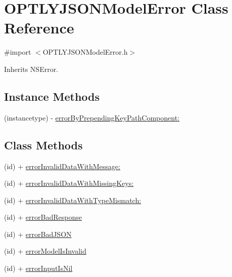 \hypertarget{interface_o_p_t_l_y_j_s_o_n_model_error}{}\section{O\+P\+T\+L\+Y\+J\+S\+O\+N\+Model\+Error Class Reference}
\label{interface_o_p_t_l_y_j_s_o_n_model_error}


{\ttfamily \#import $<$O\+P\+T\+L\+Y\+J\+S\+O\+N\+Model\+Error.\+h$>$}



Inherits N\+S\+Error.

\subsection*{Instance Methods}
\begin{DoxyCompactItemize}
\item 
(instancetype) -\/ \mbox{\hyperlink{interface_o_p_t_l_y_j_s_o_n_model_error_aed94b5156c794349970df8a5eee57a9f}{error\+By\+Prepending\+Key\+Path\+Component\+:}}
\end{DoxyCompactItemize}
\subsection*{Class Methods}
\begin{DoxyCompactItemize}
\item 
(id) + \mbox{\hyperlink{interface_o_p_t_l_y_j_s_o_n_model_error_a1da60d544a49a3600e1a6c94acfbe898}{error\+Invalid\+Data\+With\+Message\+:}}
\item 
(id) + \mbox{\hyperlink{interface_o_p_t_l_y_j_s_o_n_model_error_ad07fbdaf254311345b53418accf891c4}{error\+Invalid\+Data\+With\+Missing\+Keys\+:}}
\item 
(id) + \mbox{\hyperlink{interface_o_p_t_l_y_j_s_o_n_model_error_aeab959fed4cdeb8635770fd28e20edcf}{error\+Invalid\+Data\+With\+Type\+Mismatch\+:}}
\item 
(id) + \mbox{\hyperlink{interface_o_p_t_l_y_j_s_o_n_model_error_ab4eabf59d3e50681aec28696519a2861}{error\+Bad\+Response}}
\item 
(id) + \mbox{\hyperlink{interface_o_p_t_l_y_j_s_o_n_model_error_a2a82b06b93c814ad35c2cf018d2e6593}{error\+Bad\+J\+S\+ON}}
\item 
(id) + \mbox{\hyperlink{interface_o_p_t_l_y_j_s_o_n_model_error_ad1812b380441a653432ace9492a7e166}{error\+Model\+Is\+Invalid}}
\item 
(id) + \mbox{\hyperlink{interface_o_p_t_l_y_j_s_o_n_model_error_ad58be197c439597044a3d160c3dfa400}{error\+Input\+Is\+Nil}}
\end{DoxyCompactItemize}
